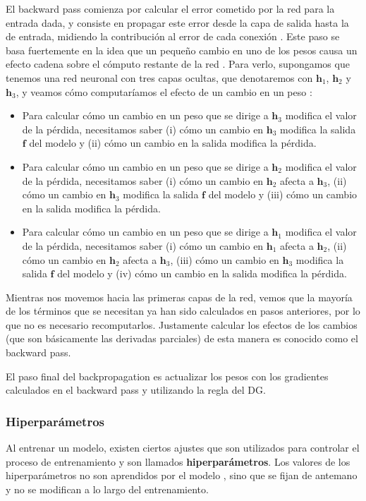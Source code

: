 \documentclass[../../main.tex]{subfiles}
\begin{document}
El backward pass comienza por calcular el error cometido por la red para la entrada dada,
y consiste en propagar este error desde la capa de salida hasta la de entrada, midiendo la
contribución al error de cada conexión \cite{hands-on-ML-sklearn-tf}. Este paso se basa
fuertemente en la idea que un pequeño cambio en uno de los pesos causa un efecto cadena
sobre el cómputo restante de la red \cite{prince2024understanding}. Para verlo,
supongamos que tenemos una red neuronal con tres capas ocultas, que denotaremos con
\(\mathbf{h}_1\), \(\mathbf{h}_2\) y \(\mathbf{h}_3\), y veamos cómo computaríamos el
efecto de un cambio en un peso \cite{prince2024understanding}:
\begin{itemize}
    \item Para calcular cómo un cambio en un peso que se dirige a \(\mathbf{h}_3\)
    modifica el valor de la pérdida, necesitamos saber (i) cómo un cambio en \(\mathbf{h}_3\)
    modifica la salida \(\mathbf{f}\) del modelo y (ii) cómo un cambio en la salida
    modifica la pérdida.
    \item Para calcular cómo un cambio en un peso que se dirige a \(\mathbf{h}_2\)
    modifica el valor de la pérdida, necesitamos saber (i) cómo un cambio en
    \(\mathbf{h}_2\) afecta a \(\mathbf{h}_3\), (ii) cómo un cambio en \(\mathbf{h}_3\)
    modifica la salida \(\mathbf{f}\) del modelo y (iii) cómo un cambio en la salida
    modifica la pérdida.
    \item Para calcular cómo un cambio en un peso que se dirige a \(\mathbf{h}_1\)
    modifica el valor de la pérdida, necesitamos saber (i) cómo un cambio en
    \(\mathbf{h}_1\) afecta a \(\mathbf{h}_2\), (ii) cómo un cambio en
    \(\mathbf{h}_2\) afecta a \(\mathbf{h}_3\), (iii) cómo un cambio en \(\mathbf{h}_3\)
    modifica la salida \(\mathbf{f}\) del modelo y (iv) cómo un cambio en la salida
    modifica la pérdida.
\end{itemize}
Mientras nos movemos hacia las primeras capas de la red, vemos que la mayoría de los
términos que se necesitan ya han sido calculados en pasos anteriores, por lo que no es
necesario recomputarlos. Justamente calcular los efectos de los cambios (que son
básicamente las derivadas parciales) de esta manera es conocido como el backward pass.

El paso final del backpropagation es actualizar los pesos con los gradientes calculados
en el backward pass y utilizando la regla del DG.

\subsubsection{Hiperparámetros}
Al entrenar un modelo, existen ciertos ajustes que son utilizados para controlar el
proceso de entrenamiento y son llamados \textbf{hiperparámetros}. Los valores de los
hiperparámetros no son aprendidos por el modelo \cite{deep-learning}, sino que se fijan de
antemano y no se modifican a lo largo del entrenamiento.
\end{document}
